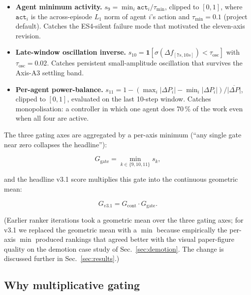 \documentclass[journal,onecolumn,11pt]{IEEEtran}
\begin{document}
\begin{itemize}
  \item[\textbf{A9.}] \textbf{Agent minimum activity.}
        $s_9 = \min_i \texttt{act}_i / \tau_{\text{min}}$, clipped to
        $[0, 1]$, where $\texttt{act}_i$ is the across-episode
        $L_1$ norm of agent $i$'s action and $\tau_{\text{min}} = 0.1$
        (project default). Catches the ES4-silent failure mode that
        motivated the eleven-axis revision.
  \item[\textbf{A10.}] \textbf{Late-window oscillation inverse.}
        $s_{10} = \mathbf{1}[\sigma(\Delta f_{[7s,10s]}) < \tau_{\text{osc}}]$
        with $\tau_{\text{osc}} = 0.02$. Catches persistent
        small-amplitude oscillation that survives the
        Axis-A3 settling band.
  \item[\textbf{A11.}] \textbf{Per-agent power-balance.}
        $s_{11} = 1 - (\max_i |\Delta P_i| - \min_i |\Delta P_i|)
                       / \overline{|\Delta P|}$,
        clipped to $[0, 1]$, evaluated on the last 10-step window.
        Catches monopolisation: a controller in which one agent
        does 70\,\% of the work even when all four are active.
\end{itemize}

The three gating axes are aggregated by a per-axis minimum
(``any single gate near zero collapses the headline''):

\begin{equation}\label{eq:gate}
  G_{\text{gate}} = \min_{k \in \{9, 10, 11\}} s_k,
\end{equation}

and the headline v3.1 score multiplies this gate into the
continuous geometric mean:

\begin{equation}\label{eq:v31}
  G_{v3.1} = G_{\text{cont}} \cdot G_{\text{gate}}.
\end{equation}

(Earlier ranker iterations took a geometric mean over the three
gating axes; for v3.1 we replaced the geometric mean with a $\min$
because empirically the per-axis $\min$ produced rankings that
agreed better with the visual paper-figure quality on the
demotion case study of Sec.~\ref{sec:demotion}. The change is
discussed further in Sec.~\ref{sec:results}.)

\subsection{Why multiplicative gating}
\end{document}
